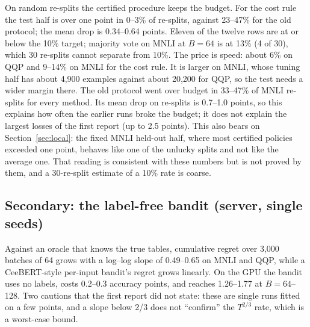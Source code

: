 On random re-splits the certified procedure keeps the budget. For the cost rule the test half is over one point in
0--3\% of re-splits, against 23--47\% for the old protocol; the mean drop is 0.34--0.64 points. Eleven of the twelve rows are at or below the 10\%
target; majority vote on MNLI at $B=64$ is at 13\% (4 of 30), which 30 re-splits cannot separate from 10\%. The price
is speed: about 6\% on QQP and 9--14\% on MNLI for the cost rule. It is larger on MNLI, whose tuning half has about
4{,}900 examples against about 20{,}200 for QQP, so the test needs a wider margin there. The old protocol went over
budget in 33--47\% of MNLI re-splits for every method. Its mean drop on re-splits is 0.7--1.0 points, so this explains
how often the earlier runs broke the budget; it does not explain the largest losses of the first report (up to 2.5
points). This also bears on Section~\ref{sec:local}: the fixed MNLI held-out half, where most certified policies
exceeded one point, behaves like one of the unlucky splits and not like the average one. That reading is consistent
with these numbers but is not proved by them, and a 30-re-split estimate of a 10\% rate is coarse.

\subsection{Secondary: the label-free bandit (server, single seeds)}
Against an oracle that knows the true tables, cumulative regret over 3{,}000 batches of 64 grows with a log--log
slope of 0.49--0.65 on MNLI and QQP, while a
CeeBERT-style per-input bandit's regret grows linearly. On the GPU the bandit uses no labels, costs 0.2--0.3 accuracy
points, and reaches 1.26--1.77\x{} at $B=64$--128. Two cautions that the first report did not state: these are single
runs fitted on a few points, and a slope below 2/3 does not ``confirm'' the $T^{2/3}$ rate, which is a worst-case
bound.

